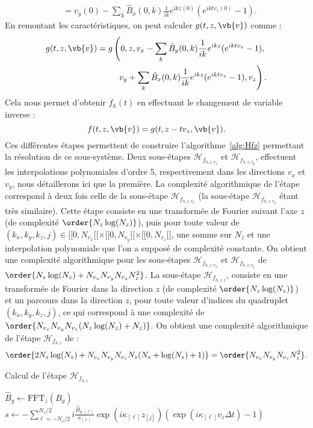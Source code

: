 \begin{itemize}
$$\begin{aligned}
               &= v_y(0) - \sum_k \hat{B}_{x} (0, k)\frac{1}{ik}e^{ik z(0)} (e^{ikt v_z(0)} -1).
      \end{aligned}
    $$
    En remontant les caractéristiques, on peut calculer $g(t,z,\vb{v})$ comme :
    $$
      \begin{aligned}
        g(t, z, \vb{v}) = g\left(0, z, v_x - \sum_k \hat{B}_{y}(0, k) \frac{1}{ik} e^{ik z}(e^{ikt v_z} -1), \right.\\
                                \left.v_y +   \sum_k \hat{B}_{x} (0, k)\frac{1}{ik} e^{ik z}(e^{ikt v_z} -1), v_z\right).  
      \end{aligned}
    $$
    Cela nous permet d'obtenir $f_h(t)$ en effectuant le changement de variable inverse :
    $$
      f(t,z,\vb{v}) = g(t,z-tv_z,\vb{v}).
    $$
    Ces différentes étapes permettent de construire l'algorithme~\ref{alg:Hfz} permettant la résolution de ce sous-système. Deux sous-étapes $\mathcal{H}_{f_{h,z,v_x}}$ et $\mathcal{H}_{f_{h,z,v_y}}$, effectuent les interpolations polynomiales d'ordre 5, respectivement dans les directions $v_x$ et $v_y$, nous détaillerons ici que la première. La complexité algorithmique de l'étape correspond à deux fois celle de la sous-étape $\mathcal{H}_{f_{h,z,v_x}}$ (la sous-étape $\mathcal{H}_{f_{h,z,v_y}}$ étant très similaire). Cette étape consiste en une transformée de Fourier suivant l'axe $z$ (de complexité $\order{N_z\log(N_z)}$), puis pour toute valeur de $(k_x,k_y,k_z,j)\in[\![0,N_{v_x}[\![\times[\![0,N_{v_y}[\![\times[\![0,N_{v_z}[\![$, une somme sur $N_z$ et une interpolation polynomiale que l'on a supposé de complexité constante. On obtient une complexité algorithmique pour les sous-étapes $\mathcal{H}_{f_{h,z,v_x}}$ et $\mathcal{H}_{f_{h,z,v_y}}$ de $\order{N_z\log(N_z)+N_{v_x}N_{v_y}N_{v_z}N_z^2}$. La sous-étape $\mathcal{H}_{f_{h,z,z}}$, consiste en une transformée de Fourier dans la direction $z$ (de complexité $\order{N_z\log(N_z)}$) et un parcours dans la direction $z$, pour toute valeur d'indices du quadruplet $(k_x,k_y,k_z,j)$, ce qui correspond à une complexité de $\order{N_{v_x}N_{v_y}N_{v_z}(N_z\log(N_z)+N_z)}$. On obtient une complexité algorithmique de l'étape $\mathcal{H}_{f_{h,z}}$ de :
    $$
      \order{2N_z\log(N_z) + N_{v_x}N_{v_y}N_{v_z}N_z(N_z + \log(N_z) + 1)}=\order{N_{v_x}N_{v_y}N_{v_z}N_z^2}.
    $$
    \begin{algorithm}
      \caption{Calcul de l'étape $\mathcal{H}_{f_{h,z}}$}
      \label{alg:Hfz}
      \begin{algorithmic}[1]
          \State $\hat{B}_y \gets \text{FFT}_z(B_y)$
          \ForAll{$(k_x,k_y,k_z)\in[\![0,N_{v_x}[\![\times[\![0,N_{v_y}[\![\times[\![0,N_{v_z}[\![$}
              \State $s \gets -\sum_{\ell=-N_z/2}^{N_z/2} i\frac{\hat{B}_{y,[\ell]}}{\kappa_{[\ell]}}\exp(i\kappa_{[\ell]}z_{[j]})(\exp(i\kappa_{[\ell]}v_z\Delta t) - 1)$


\end{algorithmic}
\end{algorithm}
\end{itemize}
